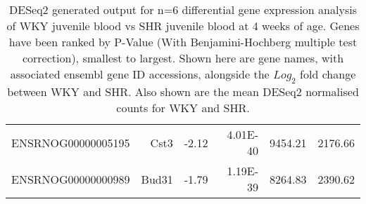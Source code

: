 \begin{sidewaystable}[]
\begin{tabular}{lrrrrr}
ENSRNOG00000005195 & Cst3            & -2.12            & 4.01E-40           & 9454.21           & 2176.66           \\
ENSRNOG00000000989 & Bud31           & -1.79            & 1.19E-39           & 8264.83           & 2390.62          
\end{tabular}
\caption[DESeq2 generated output for n=6 differential gene expression analysis of WKY juvenile blood vs SHR juvenile blood at 4 weeks of age]{DESeq2 generated output for n=6 differential gene expression analysis of WKY juvenile blood vs SHR juvenile blood at 4 weeks of age. Genes have been ranked by P-Value (With Benjamini-Hochberg multiple test correction), smallest to largest. Shown here are gene names, with associated ensembl gene ID accessions, alongside the $Log_{2}$ fold change between WKY and SHR. Also shown are the mean DESeq2 normalised counts for WKY and SHR.}
\label{fig:n6RNAseq}
\end{sidewaystable}

